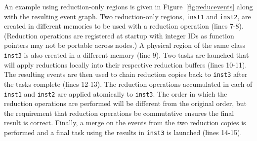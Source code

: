 An example using reduction-only regions is given in Figure~\ref{fig:reducevents} along with the resulting event graph.
Two reduction-only regions, {\tt inst1} and {\tt inst2}, are created in different memories to
be used with a reduction operation (lines 7-8).  (Reduction operations are registered at startup with integer IDs
as function pointers may not be portable across nodes.)  A physical region of the same class {\tt inst3}
is also created in a different memory (line 9).  Two tasks are launched that will apply
reductions locally into their respective reduction buffers (lines 10-11).  The resulting
events are then used to chain reduction copies back to {\tt inst3} after the tasks complete (lines 12-13).
The reduction operations accumulated in each of {\tt inst1} and {\tt inst2} are applied atomically
to {\tt inst3}.  The order in which the reduction operations are performed will be different from
the original order, but the requirement that reduction operations be commutative ensures the final
result is correct.  Finally, a merge on the events from the two reduction copies is 
performed and a final task using the results in {\tt inst3} is launched (lines 14-15).




